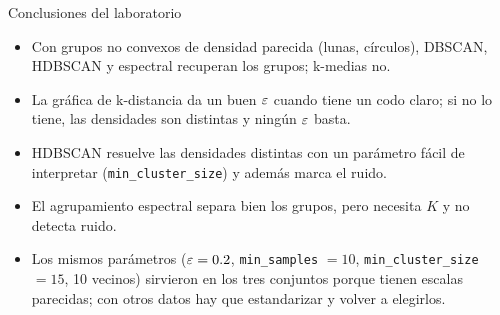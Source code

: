 \begin{frame}{Conclusiones del laboratorio}
  \begin{itemize}
    \item Con grupos no convexos de densidad parecida (lunas, círculos), DBSCAN, HDBSCAN y espectral
          recuperan los grupos; k-medias no.
    \item La gráfica de k-distancia da un buen $\varepsilon$ cuando tiene un codo claro; si no lo tiene,
          las densidades son distintas y ningún $\varepsilon$ basta.
    \item HDBSCAN resuelve las densidades distintas con un parámetro fácil de interpretar
          (\texttt{min\_cluster\_size}) y además marca el ruido.
    \item El agrupamiento espectral separa bien los grupos, pero necesita $K$ y no detecta ruido.
    \item Los mismos parámetros ($\varepsilon=0.2$, \texttt{min\_samples} $=10$, \texttt{min\_cluster\_size} $=15$,
          10 vecinos) sirvieron en los tres conjuntos porque tienen escalas parecidas; con otros
          datos hay que estandarizar y volver a elegirlos.
  \end{itemize}
\end{frame}
